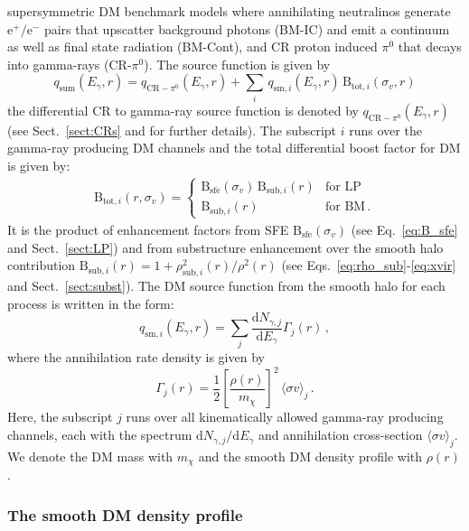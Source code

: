 \documentclass[10pt,aps,pra,reprint,amsmath,amsfonts,amssymb,showpacs,nofootinbib,floatfix]{revtex4-1}
\newcommand{\rmn}{\mathrm}
\newcommand{\sfe}{\rmn{sfe}}
\newcommand{\sub}{\rmn{sub}}
\newcommand{\B}{\rmn{B}}
\newcommand{\qCR}{q_{\rmn{CR}-\ensuremath{\pi^0}}}
\newcommand{\dd}{\rmn{d}}
\newcommand{\mx}{\ensuremath{m_{\chi}}}
\newcommand{\ngammaj}{\ensuremath{N_{\gamma,j}}}
\newcommand{\sigmaannv}{\ensuremath{\langle\sigma v\rangle}}
\newcommand{\sigv}{\ensuremath{\sigma_v}}
\newcommand{\egamma}{\ensuremath{E_{\gamma}}}
\newcommand{\eg}{E_\gamma}
\begin{document}
supersymmetric DM benchmark models where annihilating neutralinos
generate $\rmn{e}^+/\rmn{e}^-$ pairs that upscatter background photons
(BM-IC) and emit a continuum as well as final state radiation
(BM-Cont), and CR proton induced $\pi^0$ that decays into gamma-rays
(CR-$\pi^0$). The source function is given by
\begin{equation}
q_\rmn{sum} (\eg,r) = \qCR(\eg,r)+
\sum_i \,q_{\rmn{sm},i}(\eg,r)\,\B_{\rmn{tot},i}(\sigv,r)
\end{equation}
the differential CR to gamma-ray source function is denoted by
$\qCR(\eg,r)$ (see Sect.~\ref{sect:CRs} and \cite{2010MNRAS.409..449P}
for further details). The subscript $i$ runs over the gamma-ray
producing DM channels and the total differential boost factor for DM
is given by:
\begin{eqnarray}
\B_{\rmn{tot},i}(r,\sigv) = \left\{\begin{array}{cc}
\B_\sfe(\sigv)\,\B_{\sub,i}(r) &\rmn{for\,\,LP}\\
\B_{\sub,i}(r) &\rmn{for\,\,BM\,.}\end{array}\right.
\end{eqnarray}
It is the product of enhancement factors from SFE $\B_\sfe(\sigv)$
(see Eq.~\ref{eq:B_sfe} and Sect.~\ref{sect:LP}) and from substructure
enhancement over the smooth halo contribution $\B_{\sub,i}(r) =
1+\rho_{\sub,i}^2(r)/\rho^2(r)$ (see
Eqs.~\ref{eq:rho_sub}-\ref{eq:xvir} and Sect.~\ref{sect:subst}).  The
DM source function from the smooth halo for each process is written in
the form:
\begin{equation}
\label{eq:q_sm}
q_{\rmn{sm},i} (\egamma,r) = \sum_j
\frac{\dd \ngammaj}{\dd E_\gamma} \Gamma_j(r)\,,
\end{equation}
where the annihilation rate density is given by 
\begin{equation}
\label{eq:ann_rate}
\Gamma_j(r) = \frac{1}{2} \left[\frac{\rho(r)}{\mx}\right]^2 
\, \sigmaannv_j\,.
\end{equation}
Here,  the subscript $j$ runs over all kinematically allowed gamma-ray
producing channels, each with the spectrum $\dd
  \ngammaj /\dd\eg$ and annihilation cross-section $\sigmaannv_j$.
We denote the DM mass with $\mx$ and the smooth DM density profile
with $\rho(r)$.


\subsubsection{The smooth DM density profile}
\label{sect:smooth}
\end{document}
